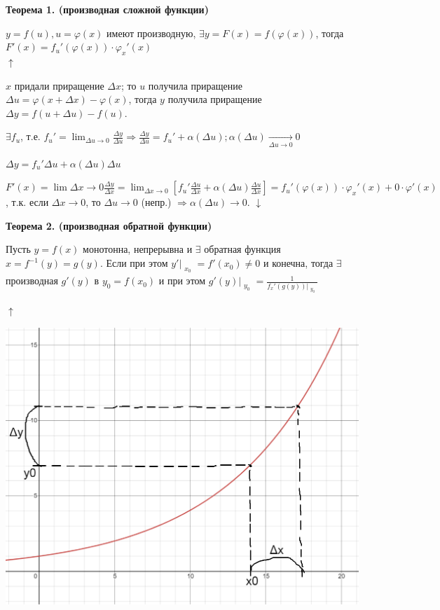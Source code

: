 \documentclass{article}
\begin{document}
    \textbf{Теорема 1. (производная сложной функции)}

    \( y = f(u), u = \varphi(x) \) имеют производную, \( \exists y= F(x) = f(\varphi(x)) \), тогда \( F'(x) = f_u'(\varphi(x)) \cdot \varphi_x'(x) \)\\
    \( \uparrow \)
    
    \(x\) придали приращение \(\Delta x\); то \(u\) получила приращение \(\Delta u = \varphi(x + \Delta x) - \varphi(x)\), тогда \(y\) получила приращение \(\Delta y = f(u + \Delta u) - f(u) \).
    
    \(\exists f_u\), т.е. \( f_u' = \lim_{\Delta u \to 0} \frac{\Delta y}{\Delta u} \Rightarrow \frac{\Delta y}{\Delta u} = f_u' + \alpha(\Delta u); \alpha(\Delta u) \xrightarrow[\Delta u \to 0]{} 0\)
    
    \(\Delta y = f_u'\Delta u + \alpha(\Delta u)\Delta u\)

    \( F'(x) = \lim{\Delta x \to 0}\frac{\Delta y}{\Delta x} = \lim_{\Delta x \to 0} [f_u'\frac{\Delta u}{\Delta x} + \alpha(\Delta u)\frac{\Delta u}{\Delta x}] = f_u'(\varphi(x)) \cdot \varphi_x'(x) + 0 \cdot \varphi'(x) \), т.к. если \( \Delta x \to 0 \), то \(\Delta u \to 0\) (непр.) \( \Rightarrow \alpha(\Delta u) \to 0 \).
    \(\downarrow\)

    \textbf{Теорема 2. (производная обратной функции)}

    Пусть \( y = f(x) \) монотонна, непрерывна и \(\exists\) обратная функция \( x = f^{-1}(y) = g(y) \). Если при этом \(y'\Bigr|_{\substack{x_0}} = f'(x_0) \neq 0\) и конечна, тогда \(\exists\) производная \( g'(y) \) в \(y_0 = f(x_0)\) и при этом \(g'(y)\Bigr|_{\substack{y_0}} = \frac{1}{f_x'(g(y))\Bigr|_{\substack{y_0}}} \)

    \(\uparrow\)
    
    \includegraphics[scale=0.3]{11_1_9_1.png}
\end{document}
